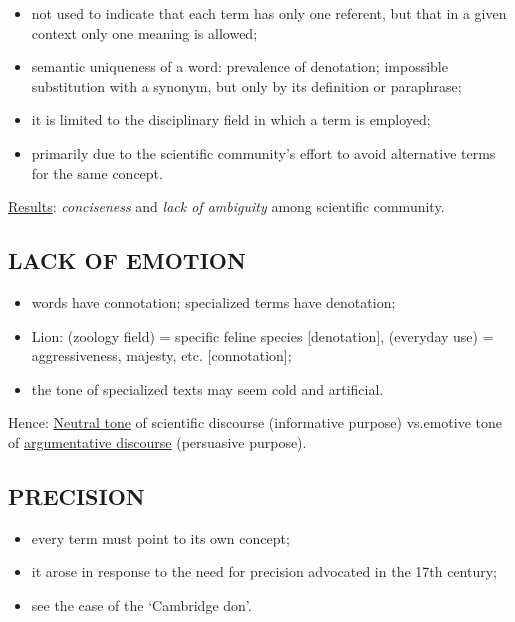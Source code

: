 \begin{itemize}

\item not used to indicate that each term has only one referent, but that in a given context only one meaning is allowed;
\item semantic uniqueness of a word: prevalence of denotation; impossible substitution with a synonym, but only by its definition or paraphrase; 
\item it is limited to the disciplinary field in which a term is employed;
\item primarily due to the scientific community’s effort to avoid alternative terms for the same concept.

\end{itemize}

\underline{Results}: \textit{conciseness} and \textit{lack of ambiguity} among scientific community. 

\subsection{LACK OF EMOTION}

\begin{itemize}

\item words have connotation; specialized terms have denotation;
\item Lion: (zoology field) = specific feline species [denotation], (everyday use) = aggressiveness, majesty, etc. [connotation];
\item the tone of specialized texts may seem cold and artificial.

\end{itemize}

Hence: \underline{Neutral tone} of scientific discourse (informative purpose) vs.\newline emotive tone of \underline{argumentative discourse} (persuasive purpose).

\subsection{PRECISION}

\begin{itemize}

\item every term must point to its own concept;
\item it arose in response to the need for precision advocated in the 17th century;
\item see the case of the ‘Cambridge don’. 

\end{itemize}

